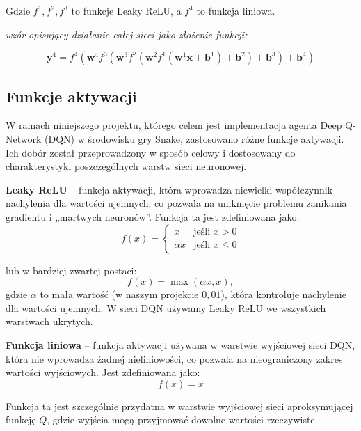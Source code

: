 \documentclass[a4paper,12pt]{article}
\begin{document}
Gdzie \(f^{1}, f^{2}, f^{3}\) to funkcje Leaky ReLU, a \(f^{4}\) to funkcja liniowa.

\textit{wzór opisujący działanie całej sieci jako złożenie funkcji:}

\begin{equation}
\mathbf{y}^{4} = f^{4}\left( \mathbf{w}^{4} f^{3} \left( \mathbf{w}^{3} f^{2} \left( \mathbf{w}^{2} f^{1}(\mathbf{w}^{1} \mathbf{x} + \mathbf{b}^{1}) + \mathbf{b}^{2} \right) + \mathbf{b}^{3} \right) + \mathbf{b}^{4} \right)
\end{equation}

\subsection{Funkcje aktywacji}

W ramach niniejszego projektu, którego celem jest implementacja agenta Deep Q-Network (DQN) w środowisku gry Snake, zastosowano różne funkcje aktywacji. Ich dobór został przeprowadzony w sposób celowy i dostosowany do charakterystyki poszczególnych warstw sieci neuronowej.

\textbf{Leaky ReLU} – funkcja aktywacji, która wprowadza niewielki współczynnik nachylenia dla wartości ujemnych, co pozwala na uniknięcie problemu zanikania gradientu i „martwych neuronów”. Funkcja ta jest zdefiniowana jako:
\begin{equation}
f(x) = \begin{cases}
x & \text{jeśli } x > 0 \\
\alpha x & \text{jeśli } x \leq 0
\end{cases}
\end{equation}

lub w bardziej zwartej postaci:
\[
f(x) = \max(\alpha x, x),
\]
gdzie \(\alpha\) to mała wartość (w naszym projekcie \(0{,}01\)), która kontroluje nachylenie dla wartości ujemnych. W sieci DQN używamy Leaky ReLU we wszystkich warstwach ukrytych.

\medskip

\textbf{Funkcja liniowa} – funkcja aktywacji używana w warstwie wyjściowej sieci DQN, która nie wprowadza żadnej nieliniowości, co pozwala na nieograniczony zakres wartości wyjściowych. Jest zdefiniowana jako:
\begin{equation}
f(x) = x
\end{equation}

Funkcja ta jest szczególnie przydatna w warstwie wyjściowej sieci aproksymującej funkcję \(Q\), gdzie wyjścia mogą przyjmować dowolne wartości rzeczywiste.
\end{document}
